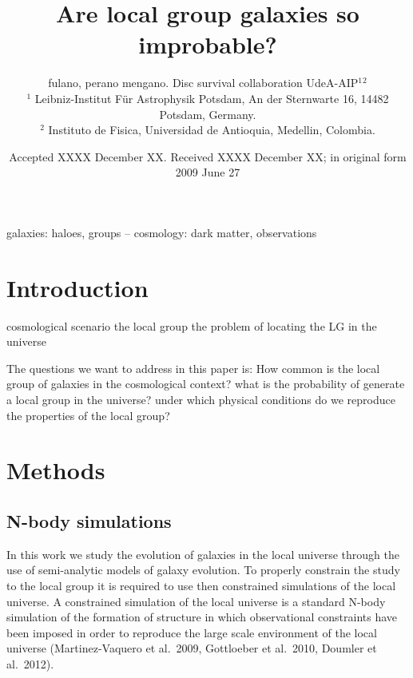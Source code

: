 \documentclass[useAMS,usenatbib]{mn2e}
\title[Are local group galaxies so improbable?]
{Are local group galaxies so improbable?}
\author[J. C. Mu\~noz-Cuartas, et al.]
{fulano, perano mengano. Disc survival collaboration UdeA-AIP$^{1}$$^{2}$\\
$^{1}$ Leibniz-Institut F\"{u}r Astrophysik Potsdam, An der Sternwarte 16, 14482
Potsdam, Germany.\\
$^{2}$ Instituto de Fisica, Universidad de Antioquia, Medellin, Colombia.
}
\newcommand{\etal}{et al.~}
\begin{document}
\date{Accepted XXXX December XX. Received XXXX December XX; in original form
  2009 June 27}

\pagerange{\pageref{firstpage}--\pageref{lastpage}} 

\maketitle

\label{firstpage}

\begin{abstract}
  


\end{abstract}

\begin{keywords}
galaxies: haloes, groups -- cosmology: dark matter, observations
\end{keywords}




\section{Introduction}

cosmological scenario
the local group
the problem of locating the LG in the universe

The questions we want to address in this paper is: How common is the
local group of galaxies in the cosmological context? what is the
probability of generate a local group in the universe? under which
physical conditions do we reproduce the properties of the local group?




\section{Methods} 
\label{sec:method}

\subsection{N-body simulations}
\label{sec:simul}

In this work we study the evolution of galaxies in the local universe
through the use of semi-analytic models of galaxy evolution. To
properly constrain the study to the local group it is required to use
then constrained simulations of the local universe. A constrained
simulation of the local universe is a standard N-body simulation of
the formation of structure in which observational constraints have
been imposed in order to reproduce the large scale environment of the
local universe (Martinez-Vaquero \etal 2009, Gottloeber \etal 2010,
Doumler \etal 2012).
\end{document}
